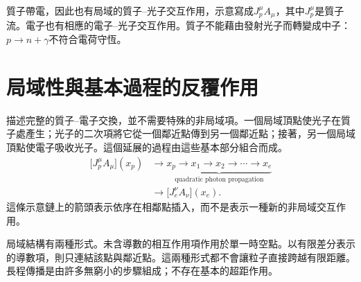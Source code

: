 質子帶電，因此也有局域的質子--光子交互作用，示意寫成\(J_p^\mu A_\mu\)，其中\(J_p^\mu\)是質子流。電子也有相應的電子--光子交互作用。質子不能藉由發射光子而轉變成中子：\(p\to n+\gamma\)不符合電荷守恆。

\begin{classroomqa}
\end{classroomqa}

\section{局域性與基本過程的反覆作用}

描述完整的質子--電子交換，並不需要特殊的非局域項。一個局域頂點使光子在質子處產生；光子的二次項將它從一個鄰近點傳到另一個鄰近點；接著，另一個局域頂點使電子吸收光子。這個延展的過程由這些基本部分組合而成。
\begin{equation}
\begin{aligned}
\bigl[J_p^\mu A_\mu\bigr](x_p)
&\longrightarrow
\underbrace{x_p\to x_1\to x_2\to\cdots\to x_e}_{\text{quadratic photon propagation}}
\\
&\longrightarrow
\bigl[J_e^\nu A_\nu\bigr](x_e).
\end{aligned}
\end{equation}
這條示意鏈上的箭頭表示依序在相鄰點插入，而不是表示一種新的非局域交互作用。

\begin{classroomqa}
\end{classroomqa}

局域結構有兩種形式。未含導數的相互作用項作用於單一時空點。以有限差分表示的導數項，則只連結該點與鄰近點。這兩種形式都不會讓粒子直接跨越有限距離。長程傳播是由許多無窮小的步驟組成；不存在基本的超距作用。

\begin{classroomqa}
\end{classroomqa}

